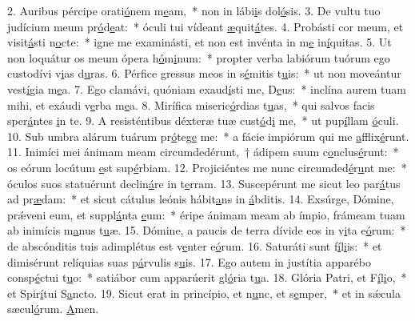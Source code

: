 2. Auribus pércipe orati\uline{ó}nem m\uline{e}am,~* non in lábi\uline{i}s dol\uline{ó}sis.
3. De vultu tuo judícium meum pr\uline{ó}d\uline{e}at:~* óculi tui vídeant \uline{æ}quit\uline{á}tes.
4. Probásti cor meum, et visit\uline{á}sti n\uline{o}cte:~* igne me examinásti, et non est invénta in m\uline{e} in\uline{í}quitas.
5. Ut non loquátur os meum ópera h\uline{ó}m\uline{i}num:~* propter verba labiórum tuórum ego custodívi v\uline{i}as d\uline{u}ras.
6. Pérfice gressus meos in s\uline{é}mitis t\uline{u}is:~* ut non moveántur vest\uline{í}gia m\uline{e}a.
7. Ego clamávi, quóniam exaud\uline{í}sti me, D\uline{e}us:~* inclína aurem tuam mihi, et exáudi v\uline{e}rba m\uline{e}a.
8. Mirífica miseric\uline{ó}rdias t\uline{u}as,~* qui salvos facis sper\uline{á}ntes \uline{i}n te.
9. A resisténtibus déxteræ tuæ cust\uline{ó}d\uline{i} me,~* ut pup\uline{í}llam \uline{ó}culi.
10. Sub umbra alárum tuárum pr\uline{ó}teg\uline{e} me:~* a fácie impiórum qui me \uline{a}fflix\uline{é}runt.
11. Inimíci mei ánimam meam circumdedérunt,~† ádipem suum c\uline{o}nclus\uline{é}runt:~* os eórum locútum \uline{e}st sup\uline{é}rbiam.
12. Projiciéntes me nunc circumded\uline{é}r\uline{u}nt me:~* óculos suos statuérunt declin\uline{á}re in t\uline{e}rram.
13. Suscepérunt me sicut leo par\uline{á}tus ad pr\uline{æ}dam:~* et sicut cátulus leónis hábit\uline{a}ns in \uline{á}bditis.
14. Exsúrge, Dómine, prǽveni eum, et suppl\uline{á}nta \uline{e}um:~* éripe ánimam meam ab ímpio, frámeam tuam ab inimícis m\uline{a}nus t\uline{u}æ.
15. Dómine, a paucis de terra dívide eos in v\uline{i}ta e\uline{ó}rum:~* de abscónditis tuis adimplétus est v\uline{e}nter e\uline{ó}rum.
16. Saturáti sunt f\uline{í}l\uline{i}is:~* et dimisérunt relíquias suas p\uline{á}rvulis s\uline{u}is.
17. Ego autem in justítia apparébo consp\uline{é}ctui t\uline{u}o:~* satiábor cum apparúerit gl\uline{ó}ria t\uline{u}a.
18. Glória Patri, et F\uline{í}l\uline{i}o,~* et Spir\uline{í}tui S\uline{a}ncto.
19. Sicut erat in princípio, et n\uline{u}nc, et s\uline{e}mper,~* et in sǽcula sæcul\uline{ó}rum. \uline{A}men.
